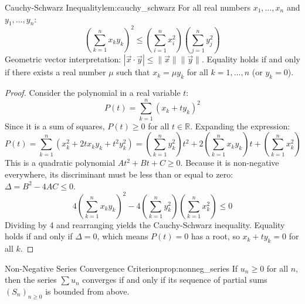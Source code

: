 \documentclass[11pt, a4paper]{article}
\begin{document}
\begin{lemma}{Cauchy-Schwarz Inequality}{lem:cauchy_schwarz}
For all real numbers $x_1, \dots, x_n$ and $y_1, \dots, y_n$:
$$ \left(\sum_{k=1}^n x_k y_k\right)^2 \le \left(\sum_{i=1}^n x_i^2\right) \left(\sum_{j=1}^n y_j^2\right) $$
Geometric vector interpretation: $|\vec{x} \cdot \vec{y}| \le \|\vec{x}\| \|\vec{y}\|$.
Equality holds if and only if there exists a real number $\mu$ such that $x_k = \mu y_k$ for all $k=1,\dots,n$ (or $y_k = 0$).
\end{lemma}
\begin{proof}
Consider the polynomial in a real variable $t$:
$$ P(t) = \sum_{k=1}^n (x_k + t y_k)^2 $$
Since it is a sum of squares, $P(t) \ge 0$ for all $t \in \mathbb{R}$. Expanding the expression:
$$ P(t) = \sum_{k=1}^n (x_k^2 + 2t x_k y_k + t^2 y_k^2) = \left(\sum_{k=1}^n y_k^2\right)t^2 + 2\left(\sum_{k=1}^n x_k y_k\right)t + \left(\sum_{k=1}^n x_k^2\right) $$
This is a quadratic polynomial $At^2 + Bt + C \ge 0$. Because it is non-negative everywhere, its discriminant must be less than or equal to zero: $\Delta = B^2 - 4AC \le 0$.
$$ 4\left(\sum_{k=1}^n x_k y_k\right)^2 - 4\left(\sum_{k=1}^n y_k^2\right)\left(\sum_{k=1}^n x_k^2\right) \le 0 $$
Dividing by 4 and rearranging yields the Cauchy-Schwarz inequality. Equality holds if and only if $\Delta = 0$, which means $P(t) = 0$ has a root, so $x_k + t y_k = 0$ for all $k$.
\end{proof}

\begin{proposition}{Non-Negative Series Convergence Criterion}{prop:nonneg_series}
If $u_n \ge 0$ for all $n$, then the series $\sum u_n$ converges if and only if its sequence of partial sums $(S_n)_{n \ge 0}$ is bounded from above.
\end{proposition}
\end{document}
